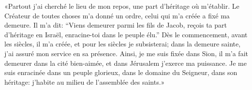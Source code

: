 «Partout j’ai cherché le lieu de mon repos,
    une part d’héritage où m’établir.
Le Créateur de toutes choses m’a donné un ordre,
    celui qui m’a créée a fixé ma demeure.
Il m’a dit: “Viens demeurer parmi les fils de Jacob,
    reçois ta part d’héritage en Israël, enracine-toi dans le peuple élu.”
Dès le commencement, avant les siècles, il m’a créée,
	et pour les siècles je subsisterai;
	dans la demeure sainte, j’ai assuré mon service en sa présence.
Ainsi, je me suis fixée dans Sion,
	il m’a fait demeurer dans la cité bien-aimée,
	et dans Jérusalem j’exerce ma puissance.
Je me suis enracinée dans un peuple glorieux,
	dans le domaine du Seigneur, dans son héritage:
	j’habite au milieu de l’assemblée des saints.»
